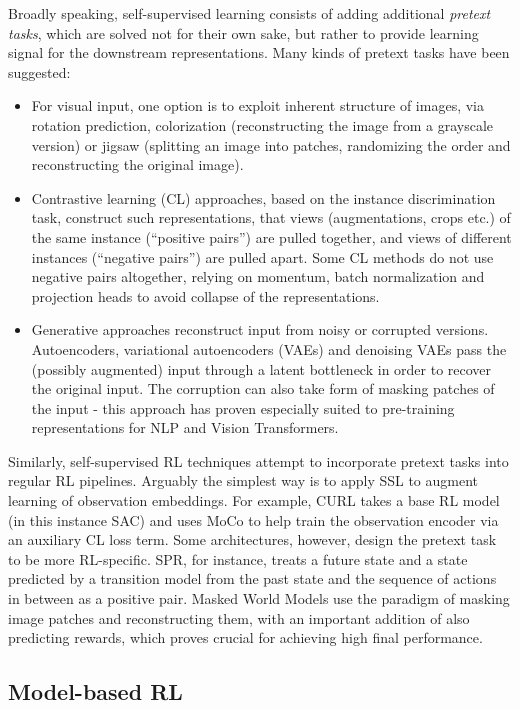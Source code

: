 \documentclass[twoside,11pt]{article}
\begin{document}
Broadly speaking, self-supervised learning consists of adding additional \emph{pretext tasks}, which are solved not for their own sake, but rather to provide learning signal for the downstream representations. Many kinds of pretext tasks have been suggested:

\begin{itemize}
  \item For visual input, one option is to exploit inherent structure of images, via rotation prediction, colorization (reconstructing the image from a grayscale version) or jigsaw (splitting an image into patches, randomizing the order and reconstructing the original image).
  \item Contrastive learning (CL) approaches, based on the instance discrimination task, construct such representations, that views (augmentations, crops etc.) of the same instance (``positive pairs'') are pulled together, and views of different instances (``negative pairs'') are pulled apart. Some CL methods do not use negative pairs altogether, relying on momentum, batch normalization and projection heads to avoid collapse of the representations.
  \item Generative approaches reconstruct input from noisy or corrupted versions. Autoencoders, variational autoencoders (VAEs) and denoising VAEs pass the (possibly augmented) input through a latent bottleneck in order to recover the original input. The corruption can also take form of masking patches of the input - this approach has proven especially suited to pre-training representations for NLP and Vision Transformers.
\end{itemize}

Similarly, self-supervised RL techniques attempt to incorporate pretext tasks into regular RL pipelines. Arguably the simplest way is to apply SSL to augment learning of observation embeddings. For example, CURL takes a base RL model (in this instance SAC) and uses MoCo to help train the observation encoder via an auxiliary CL loss term. Some architectures, however, design the pretext task to be more RL-specific. SPR, for instance, treats a future state and a state predicted by a transition model from the past state and the sequence of actions in between as a positive pair. Masked World Models use the paradigm of masking image patches and reconstructing them, with an important addition of also predicting rewards, which proves crucial for achieving high final performance.

\subsection{Model-based RL}
\end{document}

